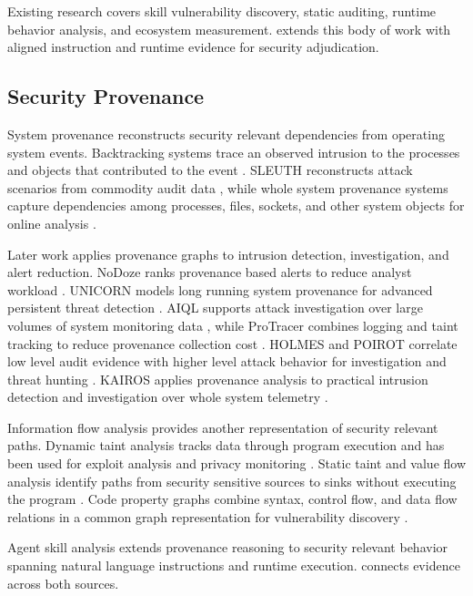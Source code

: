 Existing research covers skill vulnerability discovery, static auditing,
runtime behavior analysis, and ecosystem measurement. \system extends this
body of work with aligned instruction and runtime evidence for security
adjudication.


\subsection{Security Provenance}

System provenance reconstructs security relevant dependencies from operating
system events. Backtracking systems trace an observed intrusion to the
processes and objects that contributed to the event
\cite{king2005backtracking}. SLEUTH reconstructs attack scenarios from
commodity audit data \cite{hossain2017sleuth}, while whole system provenance
systems capture dependencies among processes, files, sockets, and other system
objects for online analysis \cite{pasquier2018camquery,
bates2015trustworthy}.

Later work applies provenance graphs to intrusion detection, investigation, and
alert reduction. NoDoze ranks provenance based alerts to reduce analyst
workload \cite{hassan2019nodoze}. UNICORN models long running system
provenance for advanced persistent threat detection
\cite{han2020unicorn}. AIQL supports attack investigation over large volumes
of system monitoring data \cite{gao2018aiql}, while ProTracer combines logging
and taint tracking to reduce provenance collection cost
\cite{ma2016protracer}. HOLMES and POIROT correlate low level audit evidence
with higher level attack behavior for investigation and threat hunting
\cite{milajerdi2019holmes,milajerdi2019poirot}. KAIROS applies provenance
analysis to practical intrusion detection and investigation over whole system
telemetry \cite{cheng2024kairos}.

Information flow analysis provides another representation of security relevant
paths. Dynamic taint analysis tracks data through program execution and has
been used for exploit analysis and privacy monitoring
\cite{newsome2005dynamic,schwartz2010all,enck2010taintdroid}. Static taint and
value flow analysis identify paths from security sensitive sources to sinks
without executing the program \cite{livshits2005static,tripp2009taj,
sui2016svf}. Code property graphs combine syntax, control flow, and data flow
relations in a common graph representation for vulnerability discovery
\cite{yama2014cpg}.

Agent skill analysis extends provenance reasoning to security relevant
behavior spanning natural language instructions and runtime execution.
\system connects evidence across both sources.